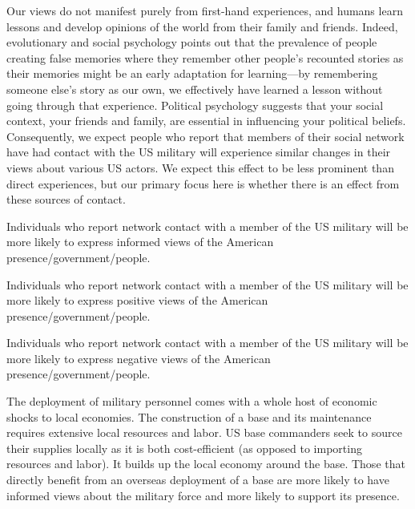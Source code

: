 \begin{subhyp}
	Our views do not manifest purely from first-hand experiences, and humans learn lessons and develop opinions of the world from their family and friends. Indeed, evolutionary and social psychology points out that the prevalence of people creating false memories where they remember other people's recounted stories as their memories might be an early adaptation for learning---by remembering someone else's story as our own, we effectively have learned a lesson without going through that experience.\cite{Ginsburg2010,Howe2011} Political psychology suggests that your social context, your friends and family, are essential in influencing your political beliefs.\cite{Campbell1960,Jasper1995,Settle2010} Consequently, we expect people who report that members of their social network have had contact with the US military will experience similar changes in their views about various US actors. We expect this effect to be less prominent than direct experiences, but our primary focus here is whether there is an effect from these sources of contact. 
	
\end{subhyp}


\begin{subhyp}
	
	\begin{hyp}
		Individuals who report network contact with a member of the US military will be more likely to express informed views of the American presence/government/people. 
	\end{hyp}
	
	
	\begin{hyp}
		Individuals who report network contact with a member of the US military will be more likely to express positive views of the American presence/government/people. 
	\end{hyp}
	
	\begin{hyp}
		Individuals who report network contact with a member of the US military will be more likely to express negative views of the American presence/government/people. 
	\end{hyp}
	
\end{subhyp}

The deployment of military personnel comes with a whole host of economic shocks to local economies. The construction of a base and its maintenance requires extensive local resources and labor. US base commanders seek to source their supplies locally as it is both cost-efficient (as opposed to importing resources and labor). It builds up the local economy around the base.\cite{rafthree20190719,kaserneone20190725} Those that directly benefit from an overseas deployment of a base are more likely to have informed views about the military force and more likely to support its presence.

